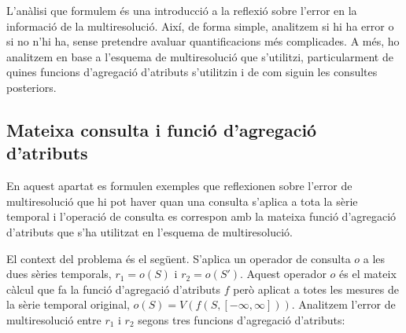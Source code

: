 


L'anàlisi que formulem és una introducció a la reflexió sobre l'error
en la informació de la multiresolució. Així, de forma simple,
analitzem si hi ha error o si no n'hi ha, sense pretendre avaluar
quantificacions més complicades. A més, ho analitzem en base a
l'esquema de multiresolució que s'utilitzi, particularment de quines
funcions d'agregació d'atributs s'utilitzin i de com siguin les
consultes posteriors.



\subsection{Mateixa consulta i funció d'agregació d'atributs}
\label{ex:multiresolucio:f=op}


En aquest apartat es formulen exemples que reflexionen sobre l'error
de multiresolució que hi pot haver quan una consulta s'aplica a tota
la sèrie temporal i l'operació de consulta es correspon amb la mateixa
funció d'agregació d'atributs que s'ha utilitzat en l'esquema de
multiresolució.




El context del problema és el següent. S'aplica un operador de
consulta $o$ a les dues sèries temporals, $r_1=o(S)$ i $r_2=o(S')$.
Aquest operador $o$ és el mateix càlcul que fa la funció d'agregació
d'atributs $f$ però aplicat a totes les mesures de la sèrie temporal
original, $o(S)=V(f(S,[-\infty,\infty]))$. Analitzem l'error de
multiresolució entre $r_1$ i $r_2$ segons tres funcions d'agregació
d'atributs:

